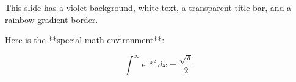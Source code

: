 \documentclass{beamer}
\begin{document}
\begin{frame}
    \frametitle{}  %

    \Large This slide has a violet background, white text,  
    a transparent title bar, and a rainbow gradient border.

    \vspace{1cm}

    Here is the **special math environment**:

    \begin{whitemath}
        \[
            \int_0^\infty e^{-x^2}\, dx = \frac{\sqrt{\pi}}{2}
        \]
    \end{whitemath}

\end{frame}
\end{document}
